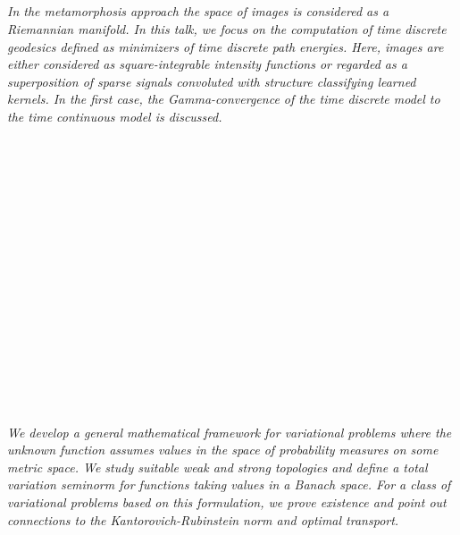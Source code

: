 \begin{multicols}{2}
        \\
        \\\\
\\
      \textit{In the metamorphosis approach the space of images is considered as a Riemannian manifold.
In this talk, we focus on the computation of time discrete geodesics
defined as minimizers of time discrete path energies.
Here, images are either considered as square-integrable intensity functions
or regarded as a superposition of sparse signals convoluted
with structure classifying learned kernels.
In the first case, the Gamma-convergence of the time discrete model to the time continuous model is discussed. }\\
\\ 
        \\
        \\\\
        \\
        \\\\
        \\
        \\\\
        \\
        \\\\
        \\
        \\\\
\\
      \textit{We develop a general mathematical framework for variational problems where the unknown function assumes values in the space of probability measures on some metric space. We study suitable weak and strong topologies and define a total variation seminorm for functions taking values in a Banach space. For a class of variational problems based on this formulation, we prove existence and point out connections to the Kantorovich-Rubinstein norm and optimal transport.}\\
\\ 
        \\
        \\\\

\end{multicols}
